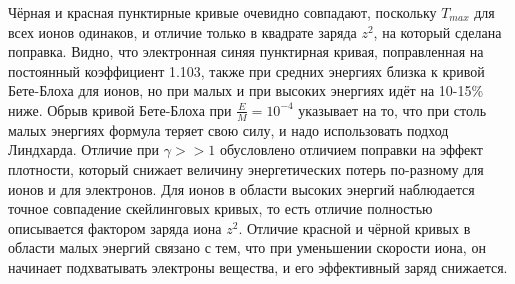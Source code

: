 \documentclass[a4paper,12pt]{article}
\begin{document}
\begin{large}
  Чёрная и красная пунктирные кривые очевидно совпадают, поскольку $T_{max}$ для всех ионов одинаков, и отличие только в квадрате заряда $z^2$, на который сделана поправка.
  Видно, что электронная синяя пунктирная кривая, поправленная на постоянный коэффициент 1.103, также при средних энергиях близка к кривой Бете-Блоха для ионов, но при малых и при высоких энергиях идёт на 10-15\% ниже.
  Обрыв кривой Бете-Блоха при $\frac{E}{M}=10^{-4}$ указывает на то, что при столь малых энергиях формула теряет свою силу, и надо использовать подход Линдхарда.
  Отличие при $\gamma >> 1$ обусловлено отличием поправки на эффект плотности, который снижает величину энергетических потерь по-разному для ионов и для электронов.
  Для ионов в области высоких энергий наблюдается точное совпадение скейлинговых кривых, то есть отличие полностью описывается фактором заряда иона $z^2$.
  Отличие красной и чёрной кривых в области малых энергий связано с тем, что при уменьшении скорости иона, он начинает подхватывать электроны вещества, и его эффективный заряд снижается.


\end{large}
\end{document}
